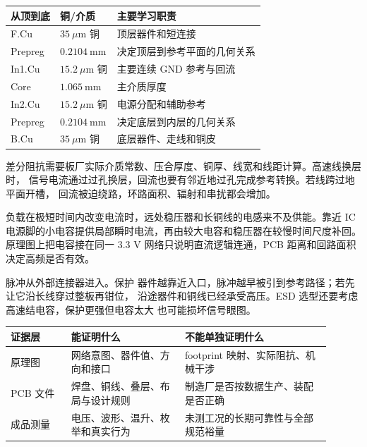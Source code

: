 \begin{center}
\begin{tabular}{lll}
\toprule
从顶到底 & 铜/介质 & 主要学习职责 \\
\midrule
F.Cu & \(35\ \mu\mathrm{m}\) 铜 & 顶层器件和短连接 \\
Prepreg & \(0.2104\ \mathrm{mm}\) & 决定顶层到参考平面的几何关系 \\
In1.Cu & \(15.2\ \mu\mathrm{m}\) 铜 & 主要连续 GND 参考与回流 \\
Core & \(1.065\ \mathrm{mm}\) & 主介质厚度 \\
In2.Cu & \(15.2\ \mu\mathrm{m}\) 铜 & 电源分配和辅助参考 \\
Prepreg & \(0.2104\ \mathrm{mm}\) & 决定底层到内层的几何关系 \\
B.Cu & \(35\ \mu\mathrm{m}\) 铜 & 底层器件、走线和铜皮 \\
\bottomrule
\end{tabular}
\end{center}

%
差分阻抗需要板厂实际介质常数、压合厚度、铜厚、线宽和线距计算。高速线换层时，
信号电流通过过孔换层，回流也要有邻近地过孔完成参考转换。若线跨过地平面开槽，
回流被迫绕路，环路面积、辐射和串扰都会增加。

%
负载在极短时间内改变电流时，远处稳压器和长铜线的电感来不及供能。靠近 IC
电源脚的小电容提供局部瞬时电流，再由较大电容和稳压器在较慢时间尺度补回。
原理图上把电容接在同一 3.3 V 网络只说明直流逻辑连通，PCB 距离和回路面积
决定高频是否有效。

%
脉冲从外部连接器进入。保护
器件越靠近入口，脉冲越早被引到参考路径；若先让它沿长线穿过整板再钳位，
沿途器件和铜线已经承受高压。ESD 选型还要考虑高速结电容，保护更强但电容太大
也可能损坏信号眼图。

%

\begin{longtable}{L{0.17\linewidth}L{0.32\linewidth}L{0.41\linewidth}}
\toprule
证据层 & 能证明什么 & 不能单独证明什么 \\
\midrule
原理图 & 网络意图、器件值、方向和接口 & footprint 映射、实际阻抗、机械干涉 \\
PCB 文件 & 焊盘、铜线、叠层、布局与设计规则 & 制造厂是否按数据生产、装配是否正确 \\
成品测量 & 电压、波形、温升、枚举和真实行为 & 未测工况的长期可靠性与全部规范裕量 \\
\bottomrule
\end{longtable}

